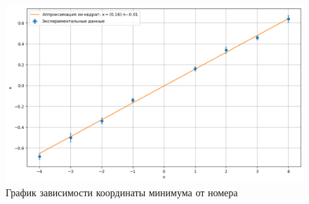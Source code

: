 \documentclass[12pt]{article}
\begin{document}
    \begin{figure}[h!]
        \centering
        \includegraphics[width=\linewidth]{pic/B}
        \caption{График зависимости координаты минимума от номера}
        \label{fig:6}
    \end{figure}
\end{document}
